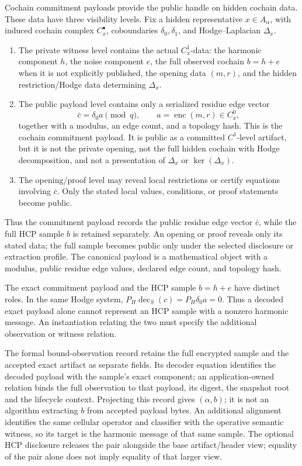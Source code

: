 Cochain commitment payloads provide the public handle on hidden cochain data.
These data have three visibility levels. Fix a hidden
representative \(x\in A_\alpha\), with induced cochain complex \(C_x^\bullet\),
coboundaries \(\delta_0,\delta_1\), and Hodge--Laplacian \(\Delta_x\).
\begin{enumerate}[label=(\roman*)]
  \item The private witness level contains the actual \(C_x^1\)-data:
    the harmonic component \(h\), the noise component \(e\), the full observed
    cochain \(b=h+e\) when it is not explicitly published, the opening data
    \((m,r)\), and the hidden restriction/Hodge data determining
    \(\Delta_x\).
  \item The public payload level contains only a serialized residue edge vector
    \[
      \bar c=\delta_0 a\pmod q,
      \qquad a=\operatorname{enc}(m,r)\in C_x^0,
    \]
    together with a modulus, an edge count, and a topology hash. This is the
    cochain commitment payload. It is public as a committed \(C^1\)-level
    artifact, but it is not the private opening, not the full hidden cochain
    with Hodge decomposition, and not a presentation of \(\Delta_x\) or
    \(\ker(\Delta_x)\).
  \item The opening/proof level may reveal local restrictions or certify
    equations involving \(\bar c\). Only the stated local values, conditions,
    or proof statements become public.
\end{enumerate}
Thus the commitment payload records the public residue edge vector
\(\bar c\), while the full HCP sample \(b\) is retained separately.
An opening or proof reveals only its stated data; the full sample becomes
public only under the selected disclosure or extraction profile.
The canonical payload is a
mathematical object with a modulus, public residue edge values, declared edge
count, and topology hash.

The exact commitment payload and the HCP sample \(b=h+e\) have distinct
roles. In the same Hodge system,
\(P_H\operatorname{dec}_S(c)=P_H\delta_0a=0\). Thus a decoded exact payload
alone cannot represent an HCP sample with a nonzero harmonic message. An
instantiation relating the two must specify the additional observation or
witness relation.

The formal bound-observation record retains the full encrypted sample and
the accepted exact artifact as separate fields. Its decoder equation
identifies the decoded payload with the sample's exact component; an
application-owned relation binds the full observation to that payload,
its digest, the snapshot root and the lifecycle context. Projecting this
record gives \((\alpha,b)\); it is not an algorithm extracting \(b\) from
accepted payload bytes. An additional alignment identifies the same
cellular operator and classifier with the operative semantic witness, so
its target is the harmonic message of that same sample. The optional HCP
disclosure releases the pair alongside the base artifact/header view;
equality of the pair alone does not imply equality of that larger view.

